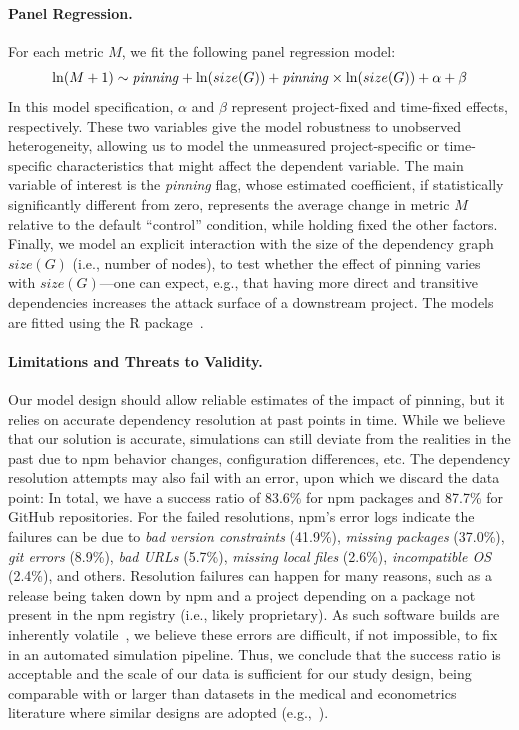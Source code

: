 \paragraph{Panel Regression.}
For each metric $M$, we fit the following panel regression model: %
\begin{equation}
\label{eq:plm}
\ln(M+1) \sim \text{\emph{pinning}} + \ln(size(G)) + \text{\emph{pinning}} \times \ln(size(G)) + \alpha + \beta 
\end{equation}
In this model specification, $\alpha$ and $\beta$ represent project-fixed and time-fixed effects, respectively. 
These two variables give the model robustness to unobserved heterogeneity, allowing us to model the unmeasured project-specific or time-specific characteristics that might affect the dependent variable.
The main variable of interest is the \textit{pinning} flag, whose estimated coefficient, if statistically significantly different from zero, represents the average change in metric $M$ relative to the default ``control'' condition, while holding fixed the other factors.
Finally, we model an explicit interaction with the size of the dependency graph $size(G)$ (i.e., number of nodes), to test whether the effect of pinning varies with $size(G)$---one can expect, e.g., that having more direct and transitive dependencies increases the attack surface of a downstream project.
The models are fitted using the R  package~\cite{r-plm}.

\paragraph{Limitations and Threats to Validity.}

Our model design should allow reliable estimates of the impact of pinning, but it relies on accurate dependency resolution at past points in time.
While we believe that our solution is accurate, simulations can still deviate from the realities in the past due to npm behavior changes, configuration differences, etc. 
The dependency resolution attempts may also fail with an error, upon which we discard the data point: In total, we have a success ratio of 83.6\% for npm packages and 87.7\% for GitHub repositories.
For the failed resolutions, npm's error logs indicate the failures can be due to \emph{bad version constraints} (41.9\%), \emph{missing packages} (37.0\%), \emph{git errors} (8.9\%), \emph{bad URLs} (5.7\%), \emph{missing local files} (2.6\%), \emph{incompatible OS} (2.4\%), and others.
Resolution failures can happen for many reasons, such as a release being taken down by npm and a project depending on a package not present in the npm registry (i.e., likely proprietary).
As such software builds are inherently volatile~\cite{DBLP:conf/icse/SeoSEAB14, DBLP:conf/icse/DmeiriTWBLDVR19}, we believe these errors are difficult, if not impossible, to fix in an automated simulation pipeline.
Thus, we conclude that the success ratio is acceptable and the scale of our data is sufficient for our study design, being comparable with or larger than datasets in the medical and econometrics literature where similar designs are adopted (e.g.,~\cite{crouse1999randomized, stutzer2006does, gerstorf2010late}).

